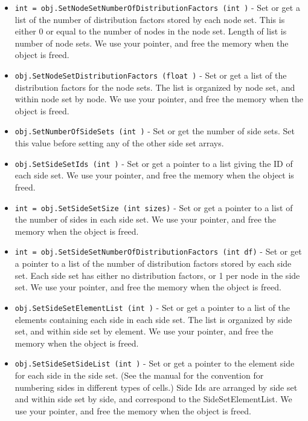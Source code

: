 \begin{itemize}
\item  \verb|int = obj.SetNodeSetNumberOfDistributionFactors (int )| -    Set or get a list of the number of distribution factors stored
   by each node set.  This is either 0 or equal to the number of
   nodes in the node set. 
   Length of list is number of node sets.
   We use your pointer, and free the memory when the object is freed.

\item  \verb|obj.SetNodeSetDistributionFactors (float )| -    Set or get a list of the distribution factors for the node sets.
   The list is organized by node set, and within node set by node.
   We use your pointer, and free the memory when the object is freed.

\item  \verb|obj.SetNumberOfSideSets (int )| -    Set or get the number of side sets.  Set this value before
   setting any of the other side set arrays.

\item  \verb|obj.SetSideSetIds (int )| -    Set or get a pointer to a list giving the ID of each side set. 
   We use your pointer, and free the memory when the object is freed.

\item  \verb|int = obj.SetSideSetSize (int sizes)| -    Set or get a pointer to a list of the number of sides  in each side set.
   We use your pointer, and free the memory when the object is freed.

\item  \verb|int = obj.SetSideSetNumberOfDistributionFactors (int df)| -    Set or get a pointer to a list of the number of distribution
   factors stored by each side set.   Each side set has either
   no distribution factors, or 1 per node in the side set.
   We use your pointer, and free the memory when the object is freed.

\item  \verb|obj.SetSideSetElementList (int )| -    Set or get a pointer to a list of the elements containing each
   side in each side set.  The list is organized by side set, and
   within side set by element.
   We use your pointer, and free the memory when the object is freed.

\item  \verb|obj.SetSideSetSideList (int )| -    Set or get a pointer to the element side for each side in the side set.
   (See the manual for the convention for numbering sides in different
   types of cells.)  Side Ids are arranged by side set and within
   side set by side, and correspond to the SideSetElementList.
   We use your pointer, and free the memory when the object is freed.


\end{itemize}
